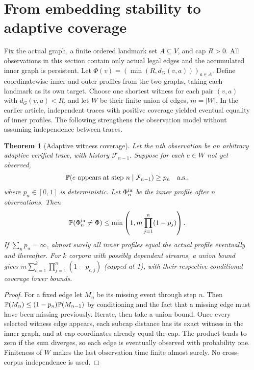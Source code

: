 \documentclass[11pt]{article}
\newtheorem{theorem}{Theorem}[section]\newtheorem{proposition}[theorem]{Proposition}\newtheorem{lemma}[theorem]{Lemma}\newtheorem{corollary}[theorem]{Corollary}
\theoremstyle{definition}\newtheorem{definition}[theorem]{Definition}\newtheorem{example}[theorem]{Example}\newtheorem{conjecture}[theorem]{Conjecture}
\begin{document}
\section{From embedding stability to adaptive coverage}
Fix the actual graph, a finite ordered landmark set $A\subseteq V$, and cap $R>0$. All observations in this section contain only actual legal edges and the accumulated inner graph is persistent. Let $\Phi(v)=(\min(R,d_G(v,a)))_{a\in A}$. Define coordinatewise inner and outer profiles from the two graphs, taking each landmark as its own target. Choose one shortest witness for each pair $(v,a)$ with $d_G(v,a)<R$, and let $W$ be their finite union of edges, $m=|W|$. In the earlier article, independent traces with positive coverage yielded eventual equality of inner profiles. The following strengthens the observation model without assuming independence between traces.
\begin{theorem}[Adaptive witness coverage]\label{thm:coverage}
Let the $n$th observation be an arbitrary adaptive verified trace, with history $\mathcal F_{n-1}$. Suppose for each $e\in W$ not yet observed,
\[\mathbb P(e\text{ appears at step }n\mid\mathcal F_{n-1})\ge p_n\quad\text{a.s.},\]
where $p_n\in[0,1]$ is deterministic. Let $\Phi_n^{\rm in}$ be the inner profile after $n$ observations. Then
\[\mathbb P(\Phi_n^{\rm in}\ne\Phi)\le\min\left(1,m\prod_{j=1}^n(1-p_j)\right).\]
If $\sum_n p_n=\infty$, almost surely all inner profiles equal the actual profile eventually and thereafter. For $k$ corpora with possibly dependent streams, a union bound gives $m\sum_{c=1}^k\prod_{j=1}^n(1-p_{c,j})$ (capped at 1), with their respective conditional coverage lower bounds.
\end{theorem}
\begin{proof} For a fixed edge let $M_n$ be its missing event through step $n$. Then $\mathbb P(M_n)\le(1-p_n)\mathbb P(M_{n-1})$ by conditioning and the fact that a missing edge must have been missing previously. Iterate, then take a union bound. Once every selected witness edge appears, each subcap distance has its exact witness in the inner graph, and at-cap coordinates already equal the cap. The product tends to zero if the sum diverges, so each edge is eventually observed with probability one. Finiteness of $W$ makes the last observation time finite almost surely. No cross-corpus independence is used.\end{proof}
\end{document}
